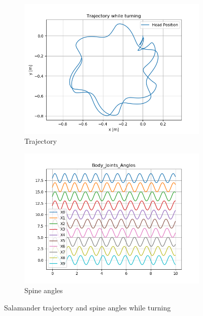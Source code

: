 \documentclass{cmc}
\begin{document}
\begin{figure}[H] 
  \begin{subfigure}[b]{0.5\linewidth}
    \centering
    \includegraphics[width=0.9\linewidth]{figures/Trajectory_8d1.png} 
    \caption{Trajectory} 
    \label{fig:exercise8d1_behaviour:a} 
  \end{subfigure}%
  \begin{subfigure}[b]{0.5\linewidth}
    \centering
    \includegraphics[width=0.9\linewidth]{figures/phase_angle_body_8d1.png} 
    \caption{Spine angles} 
    \label{fig:exercise8d1_behaviour:b} 
  \end{subfigure}
  \caption{Salamander trajectory and spine angles while turning}
  \label{fig:exercise8d1_behaviour} 
\end{figure}
\end{document}

